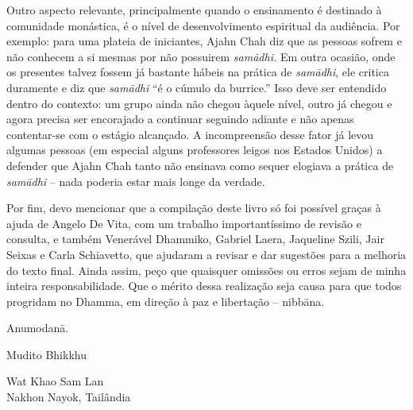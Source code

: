 Outro aspecto relevante, principalmente quando o ensinamento é
destinado à comunidade monástica, é o nível de desenvolvimento
espiritual da audiência. Por exemplo: para uma plateia de iniciantes,
Ajahn Chah diz que as pessoas sofrem e não conhecem a si mesmas por não
possuirem \emph{samādhi.} Em outra ocasião, onde os presentes
talvez fossem já bastante hábeis na prática de \emph{samādhi}, ele
critica duramente e diz que \emph{samādhi} “é o cúmulo da burrice.”
Isso deve ser entendido dentro do contexto: um grupo ainda não chegou
àquele nível, outro já chegou e agora precisa ser encorajado a
continuar seguindo adiante e não apenas contentar-se com o estágio
alcançado. A incompreensão desse fator já levou algumas pessoas (em
especial alguns professores leigos nos Estados Unidos) a defender que
Ajahn Chah tanto não ensinava como sequer elogiava a prática de
\emph{samādhi} – nada poderia estar mais longe da verdade.

Por fim, devo mencionar que a compilação deste livro só foi possível
graças à ajuda de Angelo De Vita, com um trabalho importantíssimo de
revisão e consulta, e também Venerável Dhammiko, Gabriel Laera,
Jaqueline Szili, Jair Seixas e Carla Schiavetto, que ajudaram a revisar
e dar sugestões para a melhoria do texto final. Ainda assim, peço que
quaisquer omissões ou erros sejam de minha inteira responsabilidade.
Que o mérito dessa realização seja causa para que todos progridam no
Dhamma, em direção à paz e libertação – nibbāna.

Anumodanā.
\bigskip

{\raggedleft
Mudito Bhikkhu

Wat Khao Sam Lan\\
Nakhon Nayok, Tailândia
\par}

